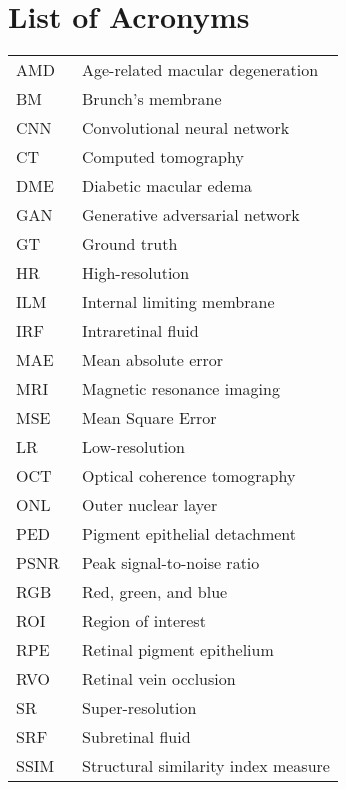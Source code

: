 \chapter*{List of Acronyms}

\begin{flushleft}
\begin{tabular}{l p{0.8\linewidth}}
	
AMD      & Age-related macular degeneration\\
BM   	 & Brunch's membrane\\
CNN      & Convolutional neural network\\
CT 		 & Computed tomography\\
DME      & Diabetic macular edema\\
GAN 	 & Generative adversarial network\\
GT  	 & Ground truth\\
HR 		 & High-resolution\\
ILM 	 & Internal limiting membrane\\
IRF      & Intraretinal fluid\\
MAE 	 & Mean absolute error\\
MRI 	 & Magnetic resonance imaging\\
MSE		 & Mean Square Error\\	
LR 		 & Low-resolution\\
OCT      & Optical coherence tomography\\
ONL      & Outer nuclear layer\\
PED      & Pigment epithelial detachment\\
PSNR 	 & Peak signal-to-noise ratio\\
RGB 	 & Red, green, and blue\\
ROI		 & Region of interest\\
RPE      & Retinal pigment epithelium\\
RVO 	 & Retinal vein occlusion\\
SR		 & Super-resolution\\
SRF      & Subretinal fluid\\
SSIM 	 & Structural similarity index measure\\

\end{tabular}
\end{flushleft}

